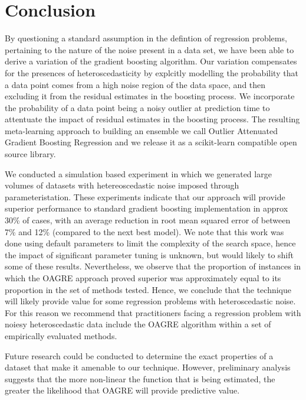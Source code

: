 \documentclass[graybox]{svmult}
\begin{document}
\section{Conclusion}

By questioning a standard assumption in the defintion of regression problems, pertaining to the nature of the noise 
present in a data set, we have been able to derive a variation of the gradient boosting algorithm. Our variation 
compensates for the presences of heteroscedasticity by explcitly modelling the probability that a data point comes
from a high noise region of the data space, and then excluding it from the residual estimates in the boosting process.
We incorporate the probability of a data point being a noisy outlier at prediction time to attentuate the impact of 
residual estimates in the boosting process. 
The resulting meta-learning approach to building an ensemble we call Outlier Attenuated Gradient
Boosting Regression and we release it as a scikit-learn compatible open source library. 

We conducted a simulation based experiment in which we generated large volumes of datasets with hetereoscedastic noise
imposed through parameteristation. These experiments indicate that our approach will provide superior
performance to standard gradient boosting implementation in approx 30\% of cases, with an average reduction in root mean
squared error of between 7\% and 12\% (compared to the next best model). 
We note that this work was done using default parameters to limit the complexity of the search space, hence the impact of 
significant parameter tuning is unknown, but would likely to shift some of these results. Nevertheless, we observe that the 
proportion of instances in which the OAGRE approach proved superior was approximately equal to its proportion in the set of 
methods tested. Hence, we conclude that the technique will likely provide value for some regression problems with heteroscedastic
noise. For this reason we recommend that practitioners facing a regression problem with noiesy heteroscedastic data include the
OAGRE algorithm within a set of empirically evaluated methods. 

Future research could be conducted to determine the exact properties of a dataset that make it amenable to our technique. 
However, preliminary analysis suggests that the more non-linear the function that is being estimated, the greater the likelihood that
OAGRE will provide predictive value.



\end{document}
